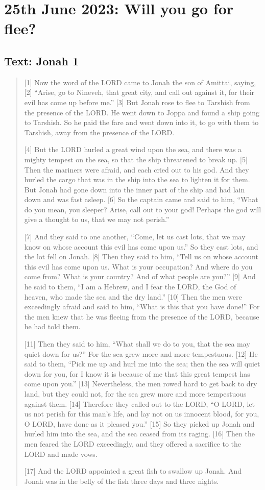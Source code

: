 \setcounter{figure}{0}

\section{25th June 2023: Will you go for flee?}
\subsection*{Text: Jonah 1}
  \begin{quote}
    [1] Now the word of the LORD came to Jonah the son of Amittai, saying, [2] “Arise, go to Nineveh, that great city, and call out against it, for their evil has come up before me.” [3] But Jonah rose to flee to Tarshish from the presence of the LORD. He went down to Joppa and found a ship going to Tarshish. So he paid the fare and went down into it, to go with them to Tarshish, away from the presence of the LORD.

    [4] But the LORD hurled a great wind upon the sea, and there was a mighty tempest on the sea, so that the ship threatened to break up. [5] Then the mariners were afraid, and each cried out to his god. And they hurled the cargo that was in the ship into the sea to lighten it for them. But Jonah had gone down into the inner part of the ship and had lain down and was fast asleep. [6] So the captain came and said to him, “What do you mean, you sleeper? Arise, call out to your god! Perhaps the god will give a thought to us, that we may not perish.”

    [7] And they said to one another, “Come, let us cast lots, that we may know on whose account this evil has come upon us.” So they cast lots, and the lot fell on Jonah. [8] Then they said to him, “Tell us on whose account this evil has come upon us. What is your occupation? And where do you come from? What is your country? And of what people are you?” [9] And he said to them, “I am a Hebrew, and I fear the LORD, the God of heaven, who made the sea and the dry land.” [10] Then the men were exceedingly afraid and said to him, “What is this that you have done!” For the men knew that he was fleeing from the presence of the LORD, because he had told them.

    [11] Then they said to him, “What shall we do to you, that the sea may quiet down for us?” For the sea grew more and more tempestuous. [12] He said to them, “Pick me up and hurl me into the sea; then the sea will quiet down for you, for I know it is because of me that this great tempest has come upon you.” [13] Nevertheless, the men rowed hard to get back to dry land, but they could not, for the sea grew more and more tempestuous against them. [14] Therefore they called out to the LORD, “O LORD, let us not perish for this man’s life, and lay not on us innocent blood, for you, O LORD, have done as it pleased you.” [15] So they picked up Jonah and hurled him into the sea, and the sea ceased from its raging. [16] Then the men feared the LORD exceedingly, and they offered a sacrifice to the LORD and made vows.

    [17] And the LORD appointed a great fish to swallow up Jonah. And Jonah was in the belly of the fish three days and three nights.
  \end{quote}
